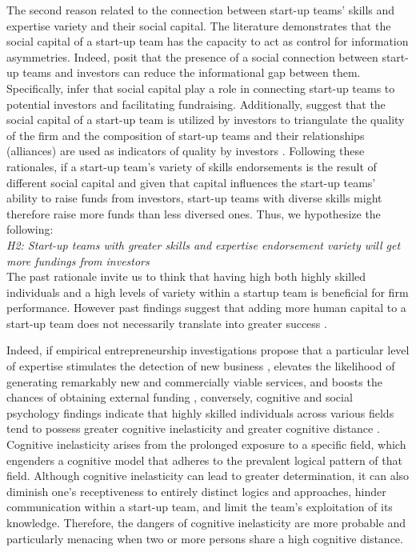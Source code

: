 \documentclass[12pt]{article}
\begin{document}
The second reason related to the connection between start-up teams' skills and expertise variety and their social capital. The literature demonstrates that the social capital of a start-up team has the capacity to act as control for information asymmetries. Indeed, \citet{huang2017resources, shane2002organizational} posit that the presence of a social connection between start-up teams and investors can reduce the informational gap between them. Specifically, \citet{shane2002network} infer that social capital play a role in connecting start-up teams to potential investors and facilitating fundraising. Additionally, \citet{hoenig2015quality} suggest that the social capital of a start-up team is utilized by investors to triangulate the quality of the firm and the composition of start-up teams and their relationships (alliances) are used as indicators of quality by investors \citep{plummer2016better, semrau2014exactly}. Following these rationales, if a start-up team's variety of skills endorsements is the result of different social capital and given that capital influences the start-up teams' ability to raise funds from investors, start-up teams with diverse skills might therefore raise more funds than less diversed ones. Thus, we hypothesize the following: \\

\noindent \textit{H2: Start-up teams with greater skills and expertise endorsement variety will get more fundings from investors} \\

The past rationale invite us to think that having high both highly skilled individuals and a high levels of variety within a startup team is beneficial for firm performance. However past findings suggest that adding more human capital to a start-up team does not necessarily translate into greater success \citep{pierce2013too}.

Indeed, if empirical entrepreneurship investigations propose that a particular level of expertise stimulates the detection of new business \citep{shane2000promise, marvel2016human}, elevates the likelihood of generating remarkably new and commercially viable services, and boosts the chances of obtaining external funding \citep{beckman2007early, marvel2007technology}, conversely, cognitive and social psychology findings indicate that highly skilled individuals across various fields tend to possess greater cognitive inelasticity and greater cognitive distance \citep{nooteboom2007optimal}. Cognitive inelasticity arises from the prolonged exposure to a specific field, which engenders a cognitive model that adheres to the prevalent logical pattern of that field. Although cognitive inelasticity can lead to greater determination, it can also diminish one's receptiveness to entirely distinct logics and approaches, hinder communication within a start-up team, and limit the team's exploitation of its knowledge. Therefore, the dangers of cognitive inelasticity are more probable and particularly menacing when two or more persons share a high cognitive distance.
\end{document}
